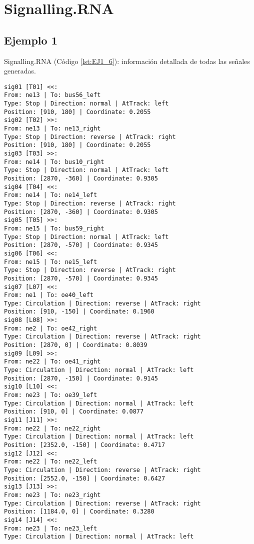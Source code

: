 \chapter{Signalling.RNA}
	\label{sec:signallingRNA}
	
	\section{Ejemplo 1}
		Signalling.RNA (Código \ref{lst:EJ1_6}): información detallada de todas las señales generadas.
		
		\begin{lstlisting}[language = {}, caption = Signalling.RNA, label = {lst:EJ1_6}]
sig01 [T01] <<:
From: ne13 | To: bus56_left
Type: Stop | Direction: normal | AtTrack: left 
Position: [910, 180] | Coordinate: 0.2055
sig02 [T02] >>:
From: ne13 | To: ne13_right
Type: Stop | Direction: reverse | AtTrack: right 
Position: [910, 180] | Coordinate: 0.2055
sig03 [T03] >>:
From: ne14 | To: bus10_right
Type: Stop | Direction: normal | AtTrack: left 
Position: [2870, -360] | Coordinate: 0.9305
sig04 [T04] <<:
From: ne14 | To: ne14_left
Type: Stop | Direction: reverse | AtTrack: right 
Position: [2870, -360] | Coordinate: 0.9305
sig05 [T05] >>:
From: ne15 | To: bus59_right
Type: Stop | Direction: normal | AtTrack: left 
Position: [2870, -570] | Coordinate: 0.9345
sig06 [T06] <<:
From: ne15 | To: ne15_left
Type: Stop | Direction: reverse | AtTrack: right 
Position: [2870, -570] | Coordinate: 0.9345
sig07 [L07] <<:
From: ne1 | To: oe40_left
Type: Circulation | Direction: reverse | AtTrack: right 
Position: [910, -150] | Coordinate: 0.1960
sig08 [L08] >>:
From: ne2 | To: oe42_right
Type: Circulation | Direction: reverse | AtTrack: right 
Position: [2870, 0] | Coordinate: 0.8039
sig09 [L09] >>:
From: ne22 | To: oe41_right
Type: Circulation | Direction: normal | AtTrack: left 
Position: [2870, -150] | Coordinate: 0.9145
sig10 [L10] <<:
From: ne23 | To: oe39_left
Type: Circulation | Direction: normal | AtTrack: left 
Position: [910, 0] | Coordinate: 0.0877
sig11 [J11] >>:
From: ne22 | To: ne22_right
Type: Circulation | Direction: normal | AtTrack: left 
Position: [2352.0, -150] | Coordinate: 0.4717
sig12 [J12] <<:
From: ne22 | To: ne22_left
Type: Circulation | Direction: reverse | AtTrack: right 
Position: [2552.0, -150] | Coordinate: 0.6427
sig13 [J13] >>:
From: ne23 | To: ne23_right
Type: Circulation | Direction: reverse | AtTrack: right 
Position: [1184.0, 0] | Coordinate: 0.3280
sig14 [J14] <<:
From: ne23 | To: ne23_left
Type: Circulation | Direction: normal | AtTrack: left 

\end{lstlisting}
